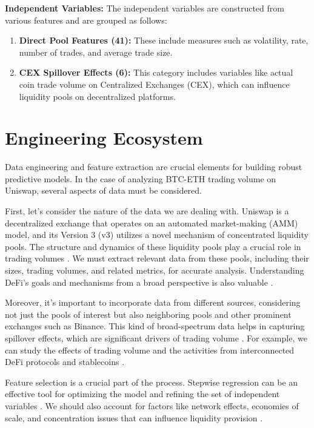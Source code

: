 \documentclass{article}
\begin{document}
\textbf{Independent Variables:} The independent variables are constructed from various features and are grouped as follows:

\begin{enumerate}[label=\arabic*. ,itemsep=0pt, topsep=0pt]
\item \textbf{Direct Pool Features (41):} These include measures such as volatility, rate, number of trades, and average trade size.
\item \textbf{CEX Spillover Effects (6):} This category includes variables like actual coin trade volume on Centralized Exchanges (CEX), which can influence liquidity pools on decentralized platforms.
\end{enumerate}

\section*{\textbf{Engineering Ecosystem}}

Data engineering and feature extraction are crucial elements for building robust predictive models. In the case of analyzing BTC-ETH trading volume on Uniswap, several aspects of data must be considered.

First, let's consider the nature of the data we are dealing with. Uniswap is a decentralized exchange that operates on an automated market-making (AMM) model, and its Version 3 (v3) utilizes a novel mechanism of concentrated liquidity pools. The structure and dynamics of these liquidity pools play a crucial role in trading volumes \cite{defi2023uniswap}. We must extract relevant data from these pools, including their sizes, trading volumes, and related metrics, for accurate analysis. Understanding DeFi's goals and mechanisms from a broad perspective is also valuable \cite{makarov2021cryptocurrencies}.

Moreover, it's important to incorporate data from different sources, considering not just the pools of interest but also neighboring pools and other prominent exchanges such as Binance. This kind of broad-spectrum data helps in capturing spillover effects, which are significant drivers of trading volume \cite{defi2023uniswap}. For example, we can study the effects of trading volume and the activities from interconnected DeFi protocols and stablecoins \cite{defi-characterisation-2023}.

Feature selection is a crucial part of the process. Stepwise regression can be an effective tool for optimizing the model and refining the set of independent variables \cite{defi2023uniswap}. We should also account for factors like network effects, economies of scale, and concentration issues that can influence liquidity provision \cite{makarov2021cryptocurrencies, defi-characterisation-2023}.
\end{document}
